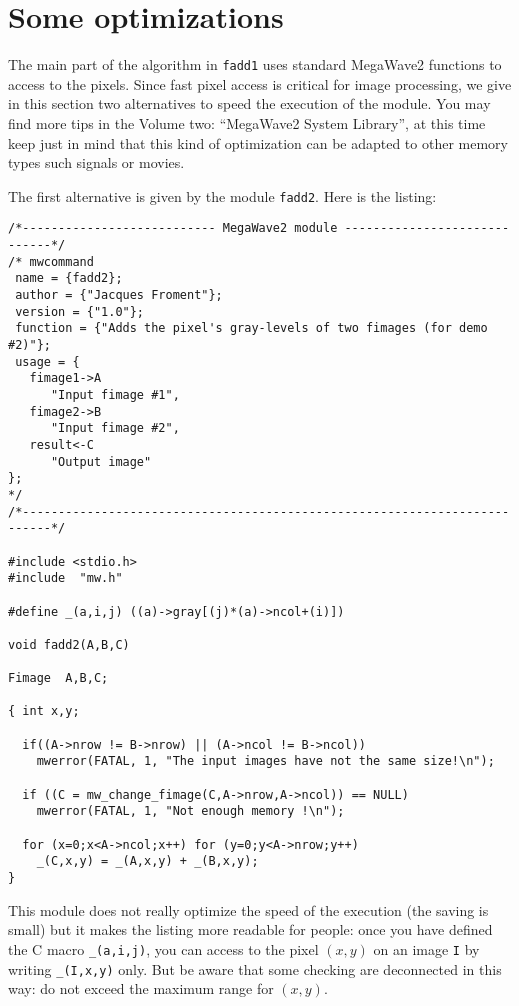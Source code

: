 \section{Some optimizations}
\label{start_optim}

The main part of the algorithm in \verb+fadd1+ uses standard MegaWave2 functions
to access to the pixels.
Since fast pixel access is critical for image processing, we give in this section two alternatives to speed the execution of the module.
You may find more tips in the Volume two: ``MegaWave2 System Library'', 
at this time keep just in mind that this kind of optimization can be adapted 
to other memory types such signals or movies.

The first alternative is given by the module \verb+fadd2+.
Here is the listing:
{\small
\label{listing_fadd2}
\begin{verbatim}
/*--------------------------- MegaWave2 module -----------------------------*/
/* mwcommand
 name = {fadd2};
 author = {"Jacques Froment"};
 version = {"1.0"};
 function = {"Adds the pixel's gray-levels of two fimages (for demo #2)"};
 usage = {
   fimage1->A 
      "Input fimage #1", 
   fimage2->B
      "Input fimage #2", 
   result<-C
      "Output image"
};
*/
/*--------------------------------------------------------------------------*/

#include <stdio.h>
#include  "mw.h"

#define _(a,i,j) ((a)->gray[(j)*(a)->ncol+(i)])

void fadd2(A,B,C)

Fimage  A,B,C;

{ int x,y;

  if((A->nrow != B->nrow) || (A->ncol != B->ncol))
    mwerror(FATAL, 1, "The input images have not the same size!\n");

  if ((C = mw_change_fimage(C,A->nrow,A->ncol)) == NULL)
    mwerror(FATAL, 1, "Not enough memory !\n");  

  for (x=0;x<A->ncol;x++) for (y=0;y<A->nrow;y++)
    _(C,x,y) = _(A,x,y) + _(B,x,y);
}
\end{verbatim}
}
This module does not really optimize the speed of the execution (the saving is small) but it makes the listing more readable for people:
once you have defined the C macro \verb+_(a,i,j)+, you can access to the pixel
$(x,y)$ on an image \verb+I+ by writing \verb+_(I,x,y)+ only.
But be aware that some checking are deconnected in this way: do not exceed the
maximum range for $(x,y)$.

